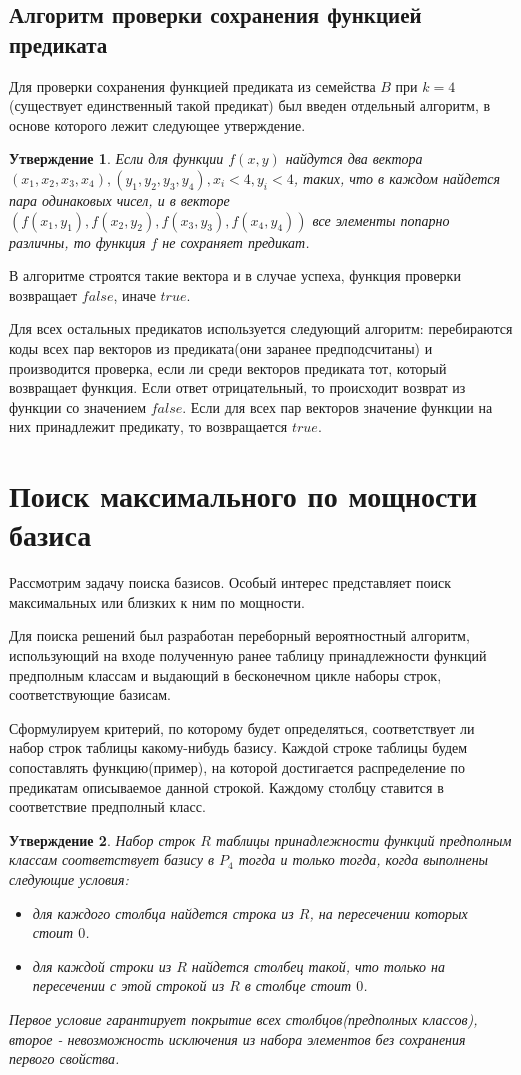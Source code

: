 \documentclass[a4paper,14pt]{extreport}
\newtheorem{utv}{Утверждение}
\begin{document}
\subsection{Алгоритм проверки сохранения функцией предиката}
Для проверки сохранения функцией предиката из семейства $B$ при $k = 4$ (существует единственный такой предикат) был введен отдельный алгоритм, в основе которого лежит следующее утверждение.
\begin{utv}
Если для функции $f(x, y)$ найдутся два вектора $(x_1, x_2, x_3, x_4), (y_1, y_2, y_3, y_4), x_i<4, y_i<4 $, таких, что в каждом найдется пара одинаковых чисел, и в векторе$(f(x_1, y_1),f(x_2, y_2),f(x_3, y_3),f(x_4, y_4))$ все элементы попарно различны, то функция $f$ не сохраняет предикат.  
\end{utv}
В алгоритме строятся такие вектора и в случае успеха, функция проверки возвращает $false$, иначе $true$.

Для всех остальных предикатов используется следующий алгоритм: перебираются коды всех пар векторов из предиката(они заранее предподсчитаны) и производится проверка, если ли среди векторов предиката тот, который возвращает функция. Если ответ отрицательный, то происходит возврат из функции со значением $false$. Если для всех пар векторов значение функции на них принадлежит предикату, то возвращается $true$. 


\newpage
\section{Поиск максимального по мощности базиса}
Рассмотрим задачу поиска базисов. Особый интерес представляет поиск максимальных или близких к ним по мощности. 

Для поиска решений был разработан переборный вероятностный алгоритм, использующий на входе полученную ранее таблицу принадлежности функций предполным классам и выдающий в бесконечном цикле наборы строк, соответствующие базисам. 

Сформулируем критерий, по которому будет определяться, соответствует ли набор строк таблицы какому-нибудь базису.
Каждой строке таблицы будем сопоставлять функцию(пример), на которой достигается распределение по предикатам описываемое данной строкой. Каждому столбцу ставится в соответствие предполный класс.  
\begin{utv}
Набор строк $R$ таблицы принадлежности функций предполным классам соответствует базису в $P_4$ тогда и только тогда, когда выполнены следующие условия:
\begin{itemize}
\item для каждого столбца найдется строка из $R$, на пересечении которых стоит $0$.    
\item для каждой строки из $R$ найдется столбец такой, что только на пересечении с этой строкой из $R$ в столбце стоит $0$.   
\end{itemize}
Первое условие гарантирует покрытие всех столбцов(предполных классов), второе - невозможность исключения из набора элементов без сохранения первого свойства. 
\end{utv}
\end{document}
